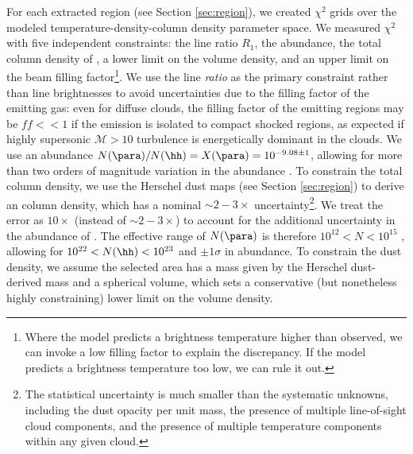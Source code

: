 For each extracted region (see Section \ref{sec:region}), we created $\chi^2$
grids over the modeled temperature-density-column density parameter space.  We
measured $\chi^2$ with five independent constraints: the line ratio $R_1$, the
\formaldehyde abundance, the total column density of \hh, a lower limit on the
\hh volume density, and an upper limit on the beam filling
factor\footnote{Where the model predicts a brightness temperature higher than
observed, we can invoke a low filling factor to explain the discrepancy.  If
the model predicts a brightness temperature too low,
we can rule it out.}.  We use the
line \emph{ratio} as the primary constraint rather than line brightnesses to
avoid uncertainties due to the filling factor of the emitting gas: even for
diffuse clouds, the filling factor of the emitting regions may be $ff<<1$ if
the emission is isolated to compact shocked regions, as expected if highly
supersonic $\mathcal{M}>10$ turbulence is energetically dominant in the clouds.
We use an abundance $N(\para)/N(\hh) = X(\para) =
10^{-9.08\pm1}$, allowing for more than two orders of magnitude variation in
the \formaldehyde abundance
\citep{Ginsburg2013a,Carey1998a,Wootten1978a,Mundy1987a}.  To constrain the
total column density, we use the Herschel dust maps (see Section
\ref{sec:region}) to derive an \hh column
density, which has a nominal $\sim2-3\times$ uncertainty\footnote{The
statistical uncertainty is much smaller than the systematic unknowns, including
the dust opacity per unit mass, the presence of multiple line-of-sight cloud
components, and the presence of multiple temperature components within any
given cloud.}.  We treat the error as $10\times$ (instead of $\sim2-3\times$)
to account for the additional uncertainty in the abundance of \para.
The effective range of $N(\para)$ is therefore $10^{12} < N < 10^{15}$ \persc,
allowing for $10^{22} < N(\hh) < 10^{23}$ \persc and $\pm1\sigma$ in abundance.
To
constrain the dust density, we assume the selected area has a mass given by the
Herschel dust-derived mass and a spherical volume, which sets a conservative
(but nonetheless highly constraining) lower limit on the volume density.

